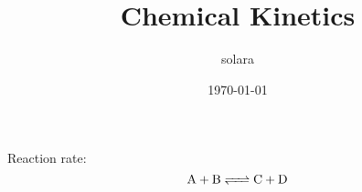 \documentclass{article}
\title{Chemical Kinetics}
\author{solara}
\date{\today}
\begin{document}
\maketitle
Reaction rate:
$$\ce{A + B <=> C + D}$$
\end{document}
